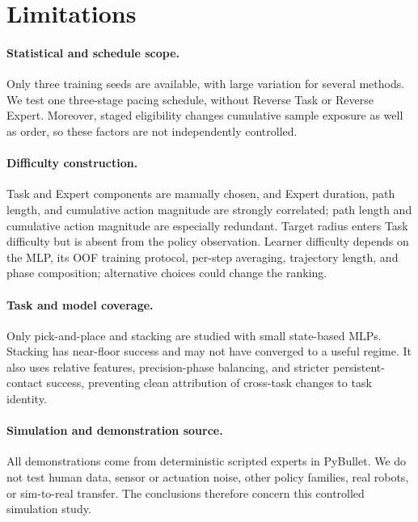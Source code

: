 \section{Limitations}
\label{sec:limitations}

\paragraph{Statistical and schedule scope.}
Only three training seeds are available, with large variation for several
methods. We test one three-stage pacing schedule, without Reverse Task or
Reverse Expert. Moreover, staged eligibility changes cumulative sample
exposure as well as order, so these factors are not independently controlled.

\paragraph{Difficulty construction.}
Task and Expert components are manually chosen, and Expert duration, path
length, and cumulative action magnitude are strongly correlated; path length
and cumulative action magnitude are especially redundant. Target radius
enters Task difficulty but is absent from the policy observation. Learner
difficulty depends on the MLP, its OOF training protocol, per-step averaging,
trajectory length, and phase composition; alternative choices could change
the ranking.

\paragraph{Task and model coverage.}
Only pick-and-place and stacking are studied with small state-based MLPs.
Stacking has near-floor success and may not have converged to a useful regime.
It also uses relative features, precision-phase balancing, and stricter
persistent-contact success, preventing clean attribution of cross-task changes
to task identity.

\paragraph{Simulation and demonstration source.}
All demonstrations come from deterministic scripted experts in PyBullet. We
do not test human data, sensor or actuation noise, other policy families, real
robots, or sim-to-real transfer. The conclusions therefore concern this
controlled simulation study.
